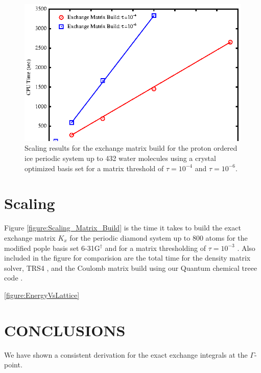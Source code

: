 \documentclass[prb,aps,nobibnotes,twocolumn,doublespace,twocolumngrid,superbib]{revtex4}
\begin{document}
%
\begin{figure}[p]
\caption{Scaling results for the exchange matrix
build  for the proton ordered ice periodic system up to 432 water molecules 
using a crystal optimized basis set\cite{CBS:511G:H,CBS:861G:MgO} for a matrix threshold of 
$\tau=10^{-4}$ and  $\tau=10^{-6}$.}
\label{figure:Scaling_Matrix_Build_Ice}
{\centering \includegraphics{Timing_pIce_ONX_2.ps} \par} 
\end{figure}


\section{Scaling}
 
Figure \ref{figure:Scaling_Matrix_Build} is the time it takes to build the
exact exchange matrix  \( K_{x} \) for the periodic diamond system up to 800 atoms for the modified pople 
basis set 6-31G$ ^\dagger$ \cite{Pople92} and for a matrix thresholding of $\tau=10^{-3}$ .
Also included in the figure for comparision are the total time for the
density matrix solver, TRS4 \cite{ANiklasson03}, 
and the Coulomb matrix build using our Quantum chemical treee code \cite{CTymczak03c}. 


\ref{figure:EnergyVsLattice}


\section{CONCLUSIONS}
We have shown a consistent derivation for the exact exchange integrals at the $\Gamma$-point. 
\end{document}
